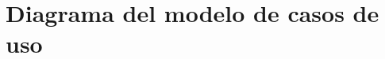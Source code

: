 
\appendix
\renewcommand{\appendixname}{Anexos}
\renewcommand{\appendixtocname}{Anexos}
\renewcommand{\appendixpagename}{Anexos}
\clearpage
\addappheadtotoc



    \begin{minipage}{0.95\textwidth}
    \chapter{Diagrama del modelo de casos de uso}
	    \label{DiagCU}
	\end{minipage}


